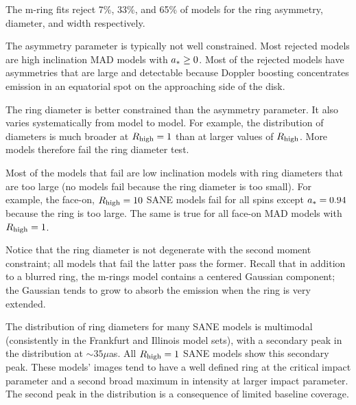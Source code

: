 \label{sec:mring}

The m-ring fits reject 7\%, 33\%, and 65\% of models for the ring asymmetry, diameter, and width respectively.

The asymmetry parameter is typically not well constrained. Most rejected models are high inclination MAD models with $a_* \ge 0$.  Most of the rejected models have asymmetries that are large and detectable because Doppler boosting concentrates emission in an equatorial spot on the approaching side of the disk.


The ring diameter is better constrained than the asymmetry parameter.  It also varies systematically from model to model.  For example, the distribution of diameters is much broader at $R_\mathrm{high} = 1$ than at larger values of $R_\mathrm{high}$.  More models therefore fail the ring diameter test.

Most of the models that fail are low inclination models with ring diameters that are too large (no models fail because the ring diameter is too small).  For example, the face-on, $R_\mathrm{high} = 10$ SANE models fail for all spins except $a_* = 0.94$ because the ring is too large.  The same is true for all face-on MAD models with $R_\mathrm{high} = 1$.

Notice that the ring diameter is not degenerate with the second moment constraint; all models that fail the latter pass the former.  Recall that in addition to a blurred ring, the m-rings model contains a centered Gaussian component; the Gaussian tends to grow to absorb the emission when the ring is very extended.

The distribution of ring diameters for many SANE models is multimodal (consistently in the Frankfurt and Illinois  model sets), with a secondary peak in the distribution at $\sim 35\mu$as.  All $R_\mathrm{high} = 1$ SANE models show this secondary peak.  These models' images tend to have a well defined ring at the critical impact parameter and a second broad maximum in intensity at larger impact parameter.  The second peak in the distribution is a consequence of limited baseline coverage.

